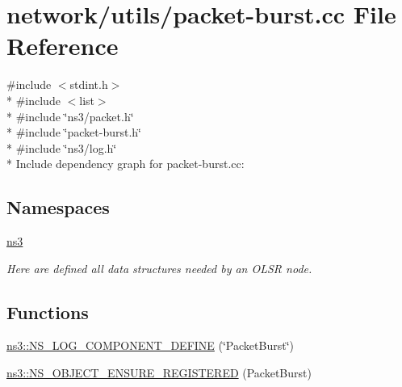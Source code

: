 \hypertarget{packet-burst_8cc}{}\section{network/utils/packet-\/burst.cc File Reference}
\label{packet-burst_8cc}
{\ttfamily \#include $<$stdint.\+h$>$}\\*
{\ttfamily \#include $<$list$>$}\\*
{\ttfamily \#include \char`\"{}ns3/packet.\+h\char`\"{}}\\*
{\ttfamily \#include \char`\"{}packet-\/burst.\+h\char`\"{}}\\*
{\ttfamily \#include \char`\"{}ns3/log.\+h\char`\"{}}\\*
Include dependency graph for packet-\/burst.cc\+:
\subsection*{Namespaces}
\begin{DoxyCompactItemize}
\item 
 \hyperlink{namespacens3}{ns3}
\begin{DoxyCompactList}\small\item\em Here are defined all data structures needed by an O\+L\+SR node. \end{DoxyCompactList}\end{DoxyCompactItemize}
\subsection*{Functions}
\begin{DoxyCompactItemize}
\item 
\hyperlink{namespacens3_a52877e7f0f83721b98ddf1814ab645c5}{ns3\+::\+N\+S\+\_\+\+L\+O\+G\+\_\+\+C\+O\+M\+P\+O\+N\+E\+N\+T\+\_\+\+D\+E\+F\+I\+NE} (\char`\"{}Packet\+Burst\char`\"{})
\item 
\hyperlink{namespacens3_a76a837535272f72a8eca8627b6dd5fa6}{ns3\+::\+N\+S\+\_\+\+O\+B\+J\+E\+C\+T\+\_\+\+E\+N\+S\+U\+R\+E\+\_\+\+R\+E\+G\+I\+S\+T\+E\+R\+ED} (Packet\+Burst)
\end{DoxyCompactItemize}
